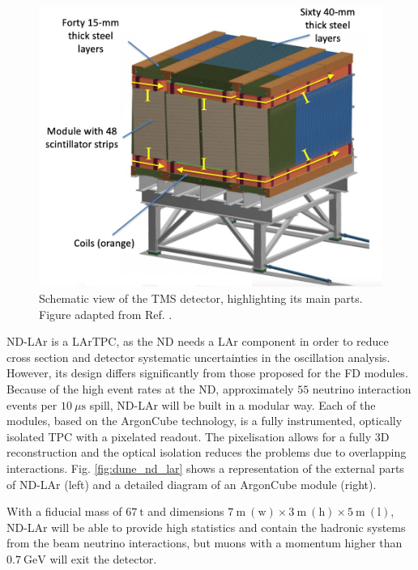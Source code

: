 \begin{figure}[t]
	\centering
	\includegraphics[width=0.65\linewidth]{Images/DUNE/ND/nd_tms}
	\caption[Schematic view of the TMS detector, highlighting its main parts.]{Schematic view of the TMS detector, highlighting its main parts. Figure adapted from Ref. \cite{DUNE2020TDR1}.}
	\label{fig:dune_tms}
\end{figure}

ND-LAr is a LArTPC, as the ND needs a LAr component in order to reduce cross section and detector systematic uncertainties in the oscillation analysis. However, its design differs significantly from those proposed for the FD modules. Because of the high event rates at the ND, approximately $55$ neutrino interaction events per $10~\mu\mathrm{s}$ spill, ND-LAr will be built in a modular way. Each of the modules, based on the ArgonCube technology, is a fully instrumented, optically isolated TPC with a pixelated readout. The pixelisation allows for a fully 3D reconstruction and the optical isolation reduces the problems due to overlapping interactions. Fig. \ref{fig:dune_nd_lar} shows a representation of the external parts of ND-LAr (left) and a detailed diagram of an ArgonCube module (right).

With a fiducial mass of $67~\mathrm{t}$ and dimensions $7~\mathrm{m} \ (\text{w}) \times 3~\mathrm{m} \ (\text{h}) \times 5~\mathrm{m} \ (\text{l})$, ND-LAr will be able to provide high statistics and contain the hadronic systems from the beam neutrino interactions, but muons with a momentum higher than $0.7~\mathrm{GeV}$ will exit the detector.

